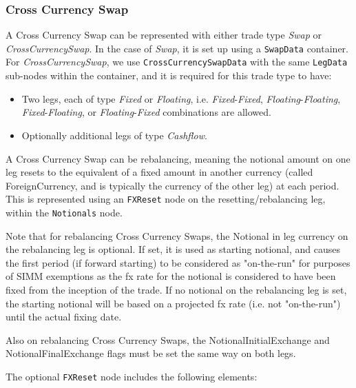 \subsubsection{Cross Currency Swap}
\label{ss:cross_currency_swap}

A Cross Currency Swap can be represented with either trade type \emph{Swap} or \emph{CrossCurrencySwap}. In the case of \emph{Swap}, it is set up using a {\tt SwapData} container. For \emph{CrossCurrencySwap}, we use {\tt CrossCurrencySwapData} with the same {\tt LegData} sub-nodes within the container, and it is required for this trade type to have: 
\begin{itemize}
 \item Two legs, each of type \emph{Fixed} or \emph{Floating}, i.e. \emph{Fixed}-\emph{Fixed}, \emph{Floating}-\emph{Floating}, \emph{Fixed}-\emph{Floating}, or \emph{Floating}-\emph{Fixed} combinations are allowed. 
\item  Optionally additional legs of type \emph{Cashflow}.
\end{itemize}


A Cross Currency Swap can be rebalancing, meaning the notional amount on one leg resets to the equivalent of a fixed amount in another currency (called ForeignCurrency, and is typically the currency of the other leg) at each period. This is represented using an \lstinline!FXReset! node on the resetting/rebalancing leg, within the \lstinline!Notionals! node. 

Note that for rebalancing Cross Currency Swaps, the Notional in leg currency on the rebalancing leg is optional. If set, it is used as starting notional, and causes the first period (if forward starting)  to be considered as "on-the-run" for purposes of SIMM exemptions as the fx rate for the notional is considered to have been fixed from the inception of the trade. If no notional on the rebalancing leg is set, the starting notional will be based on a projected fx rate (i.e. not "on-the-run") until the actual fixing date.

Also on rebalancing Cross Currency Swaps, the NotionalInitialExchange and NotionalFinalExchange flags must be set the same way on both legs.

The optional \lstinline!FXReset! node includes the following elements:

